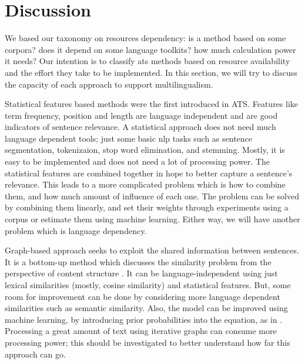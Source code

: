 %


\section{Discussion}

We based our taxonomy on resources dependency: is a method based on some corpora? does it depend on some language toolkits? how much calculation power it needs?
Our intention is to classify \ac{ats} methods based on resource availability and the effort they take to be implemented. 
In this section, we will try to discuss the capacity of each approach to support multilingualism.

Statistical features based methods were the first introduced in ATS. 
Features like term frequency, position and length are language independent and are good indicators of sentence relevance. 
A statistical approach does not need much language dependent tools; just some basic \ac{nlp} tasks such as sentence segmentation, tokenizaion, stop word elimination, and stemming. 
Mostly, it is easy to be implemented and does not need a lot of processing power.
The statistical features are combined together in hope to better capture a sentence's relevance. 
This leads to a more complicated problem which is how to combine them, and how much amount of influence of each one. 
The problem can be solved by combining them linearly, and set their weights through experiments using a corpus or estimate them using machine learning.
Either way, we will have another problem which is language dependency. 

Graph-based approach seeks to exploit the shared information between sentences. 
It is a bottom-up method which discusses the similarity problem from the perspective of content structure \citep{15-yang-al}. 
It can be language-independent using just lexical similarities (mostly, cosine similarity) and statistical features. 
But, some room for improvement can be done by considering more language dependent similarities such as semantic similarity. 
Also, the model can be improved using machine learning, by introducing prior probabilities into the equation, as in \citep{08-liu-al}.
Processing a great amount of text using iterative graphs can consume more processing power; this should be investigated to better understand how far this approach can go.

